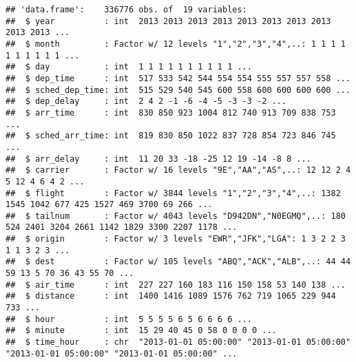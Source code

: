 \documentclass[
]{article}
\newenvironment{Shaded}{\begin{snugshade}}{\end{snugshade}}
\newcommand{\CommentTok}[1]{\textcolor[rgb]{0.56,0.35,0.01}{\textit{#1}}}
\newcommand{\KeywordTok}[1]{\textcolor[rgb]{0.13,0.29,0.53}{\textbf{#1}}}
\newcommand{\NormalTok}[1]{#1}
\newcommand{\OperatorTok}[1]{\textcolor[rgb]{0.81,0.36,0.00}{\textbf{#1}}}
\newcommand{\OtherTok}[1]{\textcolor[rgb]{0.56,0.35,0.01}{#1}}
\newcommand{\StringTok}[1]{\textcolor[rgb]{0.31,0.60,0.02}{#1}}
\begin{document}
\begin{Shaded}
\end{Shaded}

\begin{verbatim}
## 'data.frame':    336776 obs. of  19 variables:
##  $ year          : int  2013 2013 2013 2013 2013 2013 2013 2013 2013 2013 ...
##  $ month         : Factor w/ 12 levels "1","2","3","4",..: 1 1 1 1 1 1 1 1 1 1 ...
##  $ day           : int  1 1 1 1 1 1 1 1 1 1 ...
##  $ dep_time      : int  517 533 542 544 554 554 555 557 557 558 ...
##  $ sched_dep_time: int  515 529 540 545 600 558 600 600 600 600 ...
##  $ dep_delay     : int  2 4 2 -1 -6 -4 -5 -3 -3 -2 ...
##  $ arr_time      : int  830 850 923 1004 812 740 913 709 838 753 ...
##  $ sched_arr_time: int  819 830 850 1022 837 728 854 723 846 745 ...
##  $ arr_delay     : int  11 20 33 -18 -25 12 19 -14 -8 8 ...
##  $ carrier       : Factor w/ 16 levels "9E","AA","AS",..: 12 12 2 4 5 12 4 6 4 2 ...
##  $ flight        : Factor w/ 3844 levels "1","2","3","4",..: 1382 1545 1042 677 425 1527 469 3700 69 266 ...
##  $ tailnum       : Factor w/ 4043 levels "D942DN","N0EGMQ",..: 180 524 2401 3204 2661 1142 1829 3300 2207 1178 ...
##  $ origin        : Factor w/ 3 levels "EWR","JFK","LGA": 1 3 2 2 3 1 1 3 2 3 ...
##  $ dest          : Factor w/ 105 levels "ABQ","ACK","ALB",..: 44 44 59 13 5 70 36 43 55 70 ...
##  $ air_time      : int  227 227 160 183 116 150 158 53 140 138 ...
##  $ distance      : int  1400 1416 1089 1576 762 719 1065 229 944 733 ...
##  $ hour          : int  5 5 5 5 6 5 6 6 6 6 ...
##  $ minute        : int  15 29 40 45 0 58 0 0 0 0 ...
##  $ time_hour     : chr  "2013-01-01 05:00:00" "2013-01-01 05:00:00" "2013-01-01 05:00:00" "2013-01-01 05:00:00" ...
\end{verbatim}
\end{document}

